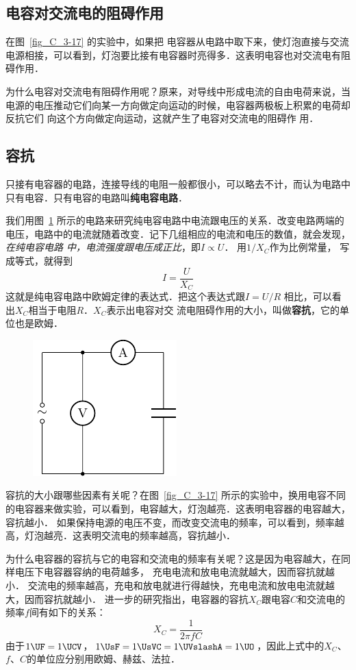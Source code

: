 \subsection{电容对交流电的阻碍作用}
在图~\ref{fig_C_3-17} 的实验中，如果把
电容器从电路中取下来，使灯泡直接与交流电源相接，可以看到，灯泡要比接有电容器时亮得多．这表明电容也对交流电有阻碍作用．

为什么电容对交流电有阻碍作用呢？原来，对导线中形成电流的自由电荷来说，当电源的电压推动它们向某一方向做定向运动的时候，电容器两极板上积累的电荷却反抗它们
向这个方向做定向运动，这就产生了电容对交流电的阻碍作
用．

\subsection{容抗}

只接有电容器的电路，连接导线的电阻一般都很小，可以略去不计，而认为电路中只有电容．只有电容的电路叫\textbf{纯电容电路}．


我们用图~\ref{fig_C_3-18} 所示的电路来研究纯电容电路中电流跟电压的关系．改变电路两端的电压，电路中的电流就随着改变．记下几组相应的电流和电压的数值，就会发现，\textit{在纯电容电路
中，电流强度跟电压成正比}，即$I\propto U$．
用$1/X_C$作为比例常量，
写成等式，就得到
\[I=\frac{U}{X_C}\]
这就是纯电容电路中欧姆定律的表达式．把这个表达式跟$I=U/R$
相比，可以看出$X_C$相当于电阻$R$．$X_C$表示出电容对交
流电阻碍作用的大小，叫做\textbf{容抗}，它的单位也是欧姆．

\begin{figure}[htbp]
	\centering
	\includegraphics{fig/C/3-18.pdf}
	\caption{}\label{fig_C_3-18}
\end{figure}


容抗的大小跟哪些因素有关呢？在图~\ref{fig_C_3-17} 所示的实验中，换用电容不同的电容器来做实验，可以看到，电容越大，灯泡越亮．这表明电容器的电容越大，容抗越小．
如果保持电源的电压不变，而改变交流电的频率，可以看到，频率越高，灯泡越亮．这表明交流电的频率越高，容抗越小．

为什么电容器的容抗与它的电容和交流电的频率有关呢？这是因为电容越大，在同样电压下电容器容纳的电荷越多，
充电电流和放电电流就越大，因而容抗就越小．
交流电的频率越高，充电和放电就进行得越快，充电电流和放电电流就越大，因而容抗就越小．
进一步的研究指出，电容器的容抗$X_C$跟电容$C$和交流电的频率$f$间有如下的关系：
\[X_C=\frac{1}{2\pi fC} \]
由于$1\UF=1\UCV$，$1 \UsF =1 \UsVC =1 \UVslashA =1\UO $，因此上式中的$X_C$、$f$、$C$的单位应分别用欧姆、赫兹、法拉．

